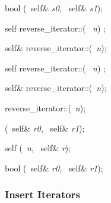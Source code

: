 \begin{multicols}{4}
bool \newline
\opereq(\const\  self\& \textit{s0}, \const\ self\& \textsl{s1});

{}

self\newline
reverse_iterator::\operp(\newline
\phantom{ABC}\Distance\ \textsl{n}) \const;

self\&\newline
reverse_iterator::\operpe(\Distance\ \textsl{n});

self\newline
reverse_iterator::\operm(\newline
\phantom{ABC}\Distance\ \textsl{n}) \const;

self\&\newline
reverse_iterator::\operme(\Distance\ \textsl{n});

\Reference{}\newline
reverse_iterator::\StrongClrBf{\indop}(\Distance\ \textsl{n});

\Distance{}\newline
\operm(\const\  self\& \textsl{r0}, \const\  self\& \textsl{r1});

self\newline
\operm(\Distance\ \textsl{n}, \const\  self\& \textsl{r});

bool\newline
\operlt(\const\  self\& \textsl{r0}, \const\  self\& \textsl{r1});

\subsubsection{Insert Iterators}


\end{multicols}
